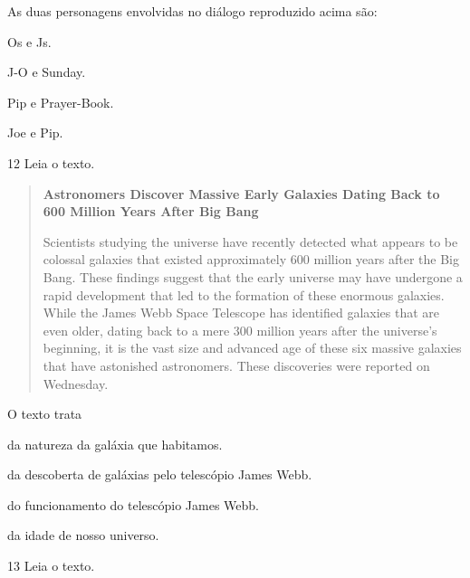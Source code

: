 As duas personagens envolvidas no diálogo reproduzido acima são:

\begin{escolha}
\item Os e Js.

\item J-O e Sunday.

\item Pip e Prayer-Book.

\item Joe e Pip.
\end{escolha}

\num{12} Leia o texto.

\begin{quote}
\textbf{Astronomers Discover Massive Early Galaxies Dating Back to 600
Million Years After Big Bang}

Scientists studying the universe have recently detected what appears to
be colossal galaxies that existed approximately 600 million years after
the Big Bang. These findings suggest that the early universe may have
undergone a rapid development that led to the formation of these
enormous galaxies. While the James Webb Space Telescope has identified
galaxies that are even older, dating back to a mere 300 million years
after the universe's beginning, it is the vast size and advanced age of
these six massive galaxies that have astonished astronomers. These
discoveries were reported on Wednesday.

\end{quote}

O texto trata

\begin{escolha}
\item da natureza da galáxia que habitamos.

\item da descoberta de galáxias pelo telescópio James Webb.

\item do funcionamento do telescópio James Webb.

\item da idade de nosso universo.
\end{escolha}

\pagebreak
\num{13} Leia o texto.

